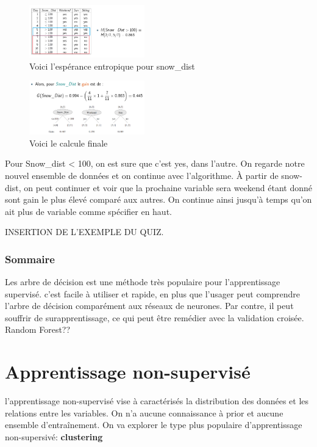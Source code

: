 \documentclass[oneside]{book}
\begin{document}
\begin{figure}[!ht]
\centering
\includegraphics[width = 5cm]{entropie2.png}
\caption{Voici l'espérance entropique pour snow\_dist}
\end{figure}


\begin{figure}[!ht]
\centering
\includegraphics[width = 5cm]{entropie3.png}
\caption{Voici le calcule finale}
\end{figure}



Pour Snow\_dist < 100,  on est sure que c'est yes, dans l'autre. On regarde notre nouvel ensemble de données et on continue avec l'algorithme. À partir de snow-dist, on peut continuer et voir que la prochaine variable sera weekend étant donné sont gain le plus élevé comparé aux autres. On continue ainsi jusqu'à temps qu'on ait plus de variable comme spécifier en haut.


INSERTION DE L'EXEMPLE DU QUIZ.

\subsection{Sommaire}
Les arbre de décision est une méthode très populaire pour l'apprentissage supervisé. c'est facile à utiliser et rapide, en plus que l'usager peut comprendre l'arbre de décision comparément aux réseaux de neurones. Par contre, il peut souffrir de surapprentissage, ce qui peut être remédier avec la validation croisée.\\

Random Forest??\\

\chapter{Apprentissage non-supervisé}
l'apprentissage non-supervisé vise à caractérisés la distribution des données et les relations entre les variables. On n'a aucune connaissance à prior et aucune ensemble d'entraînement. On va explorer le type plus populaire d'apprentissage non-supersivé: \textbf{clustering}
\end{document}
